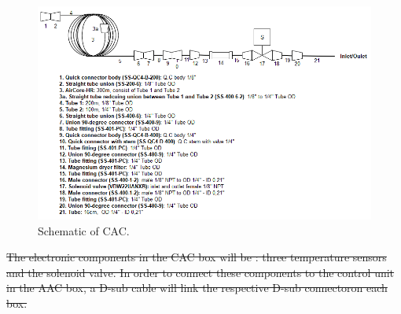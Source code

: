 \documentclass[a4paper,12pt,oneside]{article} %
\providecommand{\DIFdeltex}[1]{{\protect\color{red}\sout{#1}}}                      %
\providecommand{\DIFaddbegin}{} %
\providecommand{\DIFaddend}{} %
\providecommand{\DIFdelbegin}{} %
\providecommand{\DIFdelend}{} %
\providecommand{\DIFaddbeginFL}{} %
\providecommand{\DIFaddendFL}{} %
\providecommand{\DIFdelbeginFL}{} %
\providecommand{\DIFdelendFL}{} %
\providecommand{\DIFdel}[1]{\texorpdfstring{\DIFdeltex{#1}}{}} %
\newcommand{\DIFscaledelfig}{0.5}
\newlength{\DIFdelgraphicswidth} %
\newlength{\DIFdelgraphicsheight} %
\newcommand{\DIFaddincludegraphics}[2][]{{\color{blue}\fbox{\DIFOincludegraphics[#1]{#2}}}} %
\newcommand{\DIFdelincludegraphics}[2][]{%
\sbox{\DIFdelgraphicsbox}{\DIFOincludegraphics[#1]{#2}}%
\settoboxwidth{\DIFdelgraphicswidth}{\DIFdelgraphicsbox} %
\settoboxtotalheight{\DIFdelgraphicsheight}{\DIFdelgraphicsbox} %
\scalebox{\DIFscaledelfig}{%
\parbox[b]{\DIFdelgraphicswidth}{\usebox{\DIFdelgraphicsbox}\\[-\baselineskip] \rule{\DIFdelgraphicswidth}{0em}}\llap{\resizebox{\DIFdelgraphicswidth}{\DIFdelgraphicsheight}{%
\setlength{\unitlength}{\DIFdelgraphicswidth}%
\begin{picture}(1,1)%
\thicklines\linethickness{2pt} %
{\color[rgb]{1,0,0}\put(0,0){\framebox(1,1){}}}%
{\color[rgb]{1,0,0}\put(0,0){\line( 1,1){1}}}%
{\color[rgb]{1,0,0}\put(0,1){\line(1,-1){1}}}%
\end{picture}%
}\hspace*{3pt}}} %
} %
\DeclareRobustCommand{\DIFaddbegin}{\DIFOaddbegin \let\includegraphics\DIFaddincludegraphics} %
\DeclareRobustCommand{\DIFaddend}{\DIFOaddend \let\includegraphics\DIFOincludegraphics} %
\DeclareRobustCommand{\DIFdelbegin}{\DIFOdelbegin \let\includegraphics\DIFdelincludegraphics} %
\DeclareRobustCommand{\DIFdelend}{\DIFOaddend \let\includegraphics\DIFOincludegraphics} %
\DeclareRobustCommand{\DIFaddbeginFL}{\DIFOaddbeginFL \let\includegraphics\DIFaddincludegraphics} %
\DeclareRobustCommand{\DIFaddendFL}{\DIFOaddendFL \let\includegraphics\DIFOincludegraphics} %
\DeclareRobustCommand{\DIFdelbeginFL}{\DIFOdelbeginFL \let\includegraphics\DIFdelincludegraphics} %
\DeclareRobustCommand{\DIFdelendFL}{\DIFOaddendFL \let\includegraphics\DIFOincludegraphics} %
\begin{document}
\DIFaddbegin \begin{landscape}
\DIFaddend \begin{figure}[H]
    \centering
    \DIFdelbeginFL %
\DIFdelendFL \DIFaddbeginFL \includegraphics[width=1.3\textwidth]{4-experiment-design/img/Mechanical/CAC-schematic.PNG}
    \DIFaddendFL \caption{Schematic of CAC.}
    \label{fig:CAC-schematic}
\end{figure}
\DIFaddbegin \end{landscape}
\DIFaddend \smallskip
\DIFdelbegin \DIFdel{The electronic components in the CAC box will be : three temperature sensors and the solenoid valve. In order to connect these components to the control unit in the AAC box, a D-sub cable will link the respective D-sub connectoron each box.
}\DIFdelend 
\end{document}
